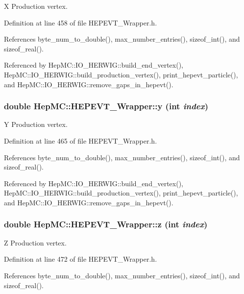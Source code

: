 X Production vertex. 



Definition at line 458 of file HEPEVT\_\-Wrapper.h.

References byte\_\-num\_\-to\_\-double(), max\_\-number\_\-entries(), sizeof\_\-int(), and sizeof\_\-real().

Referenced by Hep\-MC::IO\_\-HERWIG::build\_\-end\_\-vertex(), Hep\-MC::IO\_\-HERWIG::build\_\-production\_\-vertex(), print\_\-hepevt\_\-particle(), and Hep\-MC::IO\_\-HERWIG::remove\_\-gaps\_\-in\_\-hepevt().
\subsubsection{\setlength{\rightskip}{0pt plus 5cm}double Hep\-MC::HEPEVT\_\-Wrapper::y (int {\em index})\hspace{0.3cm}{\tt  [inline, static]}}\label{classHepMC_1_1HEPEVT__Wrapper_9ddff6e0faa83005830621428c01eb25}


Y Production vertex. 



Definition at line 465 of file HEPEVT\_\-Wrapper.h.

References byte\_\-num\_\-to\_\-double(), max\_\-number\_\-entries(), sizeof\_\-int(), and sizeof\_\-real().

Referenced by Hep\-MC::IO\_\-HERWIG::build\_\-end\_\-vertex(), Hep\-MC::IO\_\-HERWIG::build\_\-production\_\-vertex(), print\_\-hepevt\_\-particle(), and Hep\-MC::IO\_\-HERWIG::remove\_\-gaps\_\-in\_\-hepevt().
\subsubsection{\setlength{\rightskip}{0pt plus 5cm}double Hep\-MC::HEPEVT\_\-Wrapper::z (int {\em index})\hspace{0.3cm}{\tt  [inline, static]}}\label{classHepMC_1_1HEPEVT__Wrapper_68b9f32b2c5cefda476a3b05bbe831fd}


Z Production vertex. 



Definition at line 472 of file HEPEVT\_\-Wrapper.h.

References byte\_\-num\_\-to\_\-double(), max\_\-number\_\-entries(), sizeof\_\-int(), and sizeof\_\-real().

